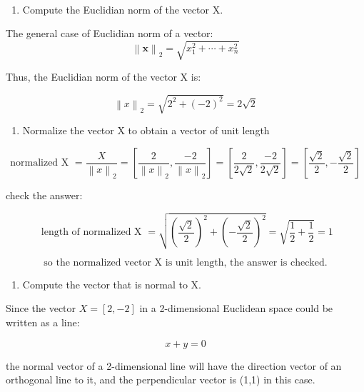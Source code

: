 \documentclass[11pt]{article}
\providecommand{\tightlist}{%
      \setlength{\itemsep}{0pt}\setlength{\parskip}{0pt}}
\begin{document}
    \begin{center}
    \end{center}
    { \hspace*{\fill} \\}
    
    \begin{enumerate}
\def\labelenumi{(\alph{enumi})}
\setcounter{enumi}{1}
\tightlist
\item
  Compute the Euclidian norm of the vector X.
\end{enumerate}

The general case of Euclidian norm of a vector:
\[{\displaystyle \left\|{\boldsymbol {x}}\right\|_{2}={\sqrt {x_{1}^{2}+\cdots +x_{n}^{2}}}}\]

Thus, the Euclidian norm of the vector X is:

\[\left\| x \right\|_2 = \sqrt{2^2 + (-2)^2} = 2 \sqrt{2}\]

    \begin{enumerate}
\def\labelenumi{(\alph{enumi})}
\setcounter{enumi}{2}
\tightlist
\item
  Normalize the vector X to obtain a vector of unit length
\end{enumerate}

\[\text{normalized X } = \frac{X}{\left\| x \right\|_2}  = \left [\frac{2}{\left\| x \right\|_2}, \frac{-2}{\left\| x \right\|_2}\right ] = \left [\frac{2}{2\sqrt{2}}, \frac{-2}{2\sqrt{2}}\right ] = \left [\frac{\sqrt{2}}{2}, -\frac{\sqrt{2}}{2} \right ]\]

check the answer:

\[\text{ length of normalized X } = \sqrt{\left (\frac{\sqrt{2}}{2} \right )^2 + \left (-\frac{\sqrt{2}}{2} \right )^2} = \sqrt{\frac{1}{2} + \frac{1}{2}} = 1 \]

\[\text {so the normalized vector X is unit length, the answer is checked.} \]

    \begin{enumerate}
\def\labelenumi{(\alph{enumi})}
\setcounter{enumi}{3}
\tightlist
\item
  Compute the vector that is normal to X.
\end{enumerate}

Since the vector \(X = [2, -2]\) in a 2-dimensional Euclidean space
could be written as a line:

\[x+y = 0\]

the normal vector of a 2-dimensional line will have the direction vector
of an orthogonal line to it, and the perpendicular vector is (1,1) in
this case.
\end{document}
